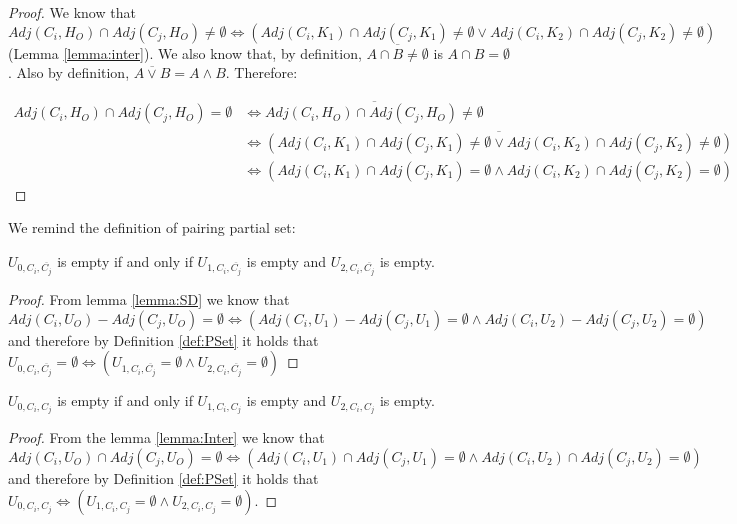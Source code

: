 \begin{proof}
We know that $Adj(C_{i}, H_{O}) \cap Adj(C_{j}, H_{O}) \neq \emptyset \Leftrightarrow (Adj(C_{i}, K_{1}) \cap Adj(C_{j}, K_{1}) \neq \emptyset \vee Adj(C_{i}, K_{2}) \cap Adj(C_{j}, K_{2}) \neq \emptyset)$ (Lemma \ref{lemma:inter}).
We also know that, by definition, $\overbar{A \cap B \neq \emptyset}$ is $A \cap B = \emptyset$.
Also by definition, $\overbar{A \vee B} = A \wedge B$.
Therefore:

\begin{align*}
Adj(C_{i}, H_{O}) \cap Adj(C_{j}, H_{O}) = \emptyset &\Leftrightarrow \overbar{Adj(C_{i}, H_{O}) \cap Adj(C_{j}, H_{O}) \neq \emptyset}\\
&\Leftrightarrow \overbar{(Adj(C_{i}, K_{1}) \cap Adj(C_{j}, K_{1}) \neq \emptyset \vee Adj(C_{i}, K_{2}) \cap Adj(C_{j}, K_{2}) \neq \emptyset)}\\
&\Leftrightarrow (Adj(C_{i}, K_{1}) \cap Adj(C_{j}, K_{1}) = \emptyset \wedge Adj(C_{i}, K_{2}) \cap Adj(C_{j}, K_{2}) = \emptyset)
\end{align*}
\end{proof}

We remind the definition of pairing partial set:

\pSet*

\begin{lemma}\label{lemma:U1}
$U_{0,C_{i},\overbar{C_{j}}}$ is empty if and only if $U_{1,C_{i},\overbar{C_{j}}}$ is empty and $U_{2,C_{i},\overbar{C_{j}}}$ is empty.
\end{lemma}

\begin{proof}
From lemma \ref{lemma:SD} we know that $Adj(C_{i}, U_{O}) - Adj(C_{j}, U_{O}) = \emptyset  \Leftrightarrow ( Adj(C_{i}, U_{1}) - Adj(C_{j}, U_{1}) = \emptyset  \wedge Adj(C_{i}, U_{2}) - Adj(C_{j}, U_{2}) = \emptyset )$ and therefore by Definition \ref{def:PSet} it holds that $U_{0,C_i,\overbar{C_j}} = \emptyset \Leftrightarrow  (U_{1,C_i,\overbar{C_j}} = \emptyset \wedge U_{2,C_i,\overbar{C_j}} = \emptyset)$
\end{proof}


\begin{lemma}\label{lemma:U2}
$U_{0,C_{i},C_{j}}$ is empty if and only if $U_{1,C_{i},C_{j}}$ is empty and $U_{2,C_{i},C_{j}}$ is empty.
\end{lemma}

\begin{proof}
From the lemma \ref{lemma:Inter} we know that $Adj(C_{i}, U_{O}) \cap Adj(C_{j}, U_{O}) = \emptyset  \Leftrightarrow (Adj(C_{i}, U_{1}) \cap Adj(C_{j}, U_{1}) = \emptyset \wedge Adj(C_{i}, U_{2}) \cap Adj(C_{j}, U_{2}) = \emptyset)$ and therefore by Definition \ref{def:PSet} it holds that $U_{0,C_i,C_j} \Leftrightarrow  (U_{1,C_i,C_j} = \emptyset \wedge U_{2,C_i,C_j} = \emptyset)$.
\end{proof}

